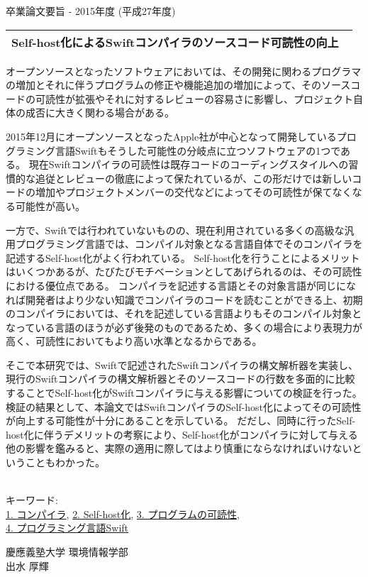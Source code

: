 卒業論文要旨 - 2015年度 (平成27年度)
\begin{center}
\begin{large}
    \begin{tabular}{|M{0.97\linewidth}|} \hline
Self-host化によるSwiftコンパイラのソースコード可読性の向上
\\ \hline
\end{tabular}
\end{large}
\end{center}

オープンソースとなったソフトウェアにおいては、その開発に関わるプログラマの増加とそれに伴うプログラムの修正や機能追加の増加によって、そのソースコードの可読性が拡張やそれに対するレビューの容易さに影響し、プロジェクト自体の成否に大きく関わる場合がある。

2015年12月にオープンソースとなったApple社が中心となって開発しているプログラミング言語Swiftもそうした可能性の分岐点に立つソフトウェアの1つである。
現在Swiftコンパイラの可読性は既存コードのコーディングスタイルへの習慣的な追従とレビューの徹底によって保たれているが、この形だけでは新しいコードの増加やプロジェクトメンバーの交代などによってその可読性が保てなくなる可能性が高い。

一方で、Swiftでは行われていないものの、現在利用されている多くの高級な汎用プログラミング言語では、コンパイル対象となる言語自体でそのコンパイラを記述するSelf-host化がよく行われている。
Self-host化を行うことによるメリットはいくつかあるが、たびたびモチベーションとしてあげられるのは、その可読性における優位点である。
コンパイラを記述する言語とその対象言語が同じになれば開発者はより少ない知識でコンパイラのコードを読むことができる上、初期のコンパイラにおいては、それを記述している言語よりもそのコンパイル対象となっている言語のほうが必ず後発のものであるため、多くの場合により表現力が高く、可読性においてもより高い水準となるからである。

そこで本研究では、Swiftで記述されたSwiftコンパイラの構文解析器を実装し、現行のSwiftコンパイラの構文解析器とそのソースコードの行数を多面的に比較することでSelf-host化がSwiftコンパイラに与える影響についての検証を行った。
検証の結果として、本論文ではSwiftコンパイラのSelf-host化によってその可読性が向上する可能性が十分にあることを示している。
だだし、同時に行ったSelf-host化に伴うデメリットの考察により、Self-host化がコンパイラに対して与える他の影響を鑑みると、実際の適用に際してはより慎重にならなければいけないということもわかった。

~ \\
キーワード:\\
\underline{1. コンパイラ},
\underline{2. Self-host化},
\underline{3. プログラムの可読性},\\
\underline{4. プログラミング言語Swift}
\begin{flushright}
慶應義塾大学 環境情報学部\\
出水 厚輝
\end{flushright}
